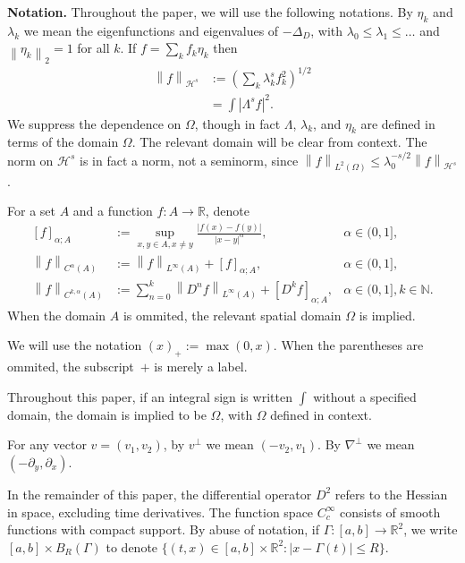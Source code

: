 \documentclass[11pt]{amsart}
\theoremstyle{remark}
\theoremstyle{definition}
\newcommand{\R}{\mathbb{R}}
\newcommand{\N}{\mathbb{N}}
\newcommand{\norm}[1]{\left\lVert#1\right\rVert}
\newcommand{\paren}[1]{\left( #1 \right)}
\newcommand{\bracket}[1]{\left[ #1 \right]}
\newcommand{\abs}[1]{\left\lvert #1 \right\rvert}
\newcommand{\del}{\partial}
\newcommand{\grad}{\nabla}
\newcommand{\Laplace}{\Delta}
\newcommand{\eigen}[1]{\eta_{#1}} %
\newcommand{\Ctest}{C_c^\infty}
\newcommand{\HD}{\mathcal{H}}
\newcommand{\HDint}[2]{\int \abs{\Lambda^{#1} #2}^2}
\begin{document}
\textbf{Notation.} Throughout the paper, we will use the following notations.
By $\eigen{k}$ and $\lambda_k$ we mean the eigenfunctions and eigenvalues of $-\Laplace_D$, with $\lambda_0 \leq \lambda_1 \leq \ldots$ and $\norm{\eigen{k}}_2 = 1$ for all $k$.  
If $f = \sum_k f_k \eigen{k}$ then
\begin{align*} 
\norm{f}_{\HD^s} &:= \paren{\sum_k \lambda_k^{s} f_k^2}^{1/2} 
\\ &= \HDint{s}{f}. 
\end{align*}
We suppress the dependence on $\Omega$, though in fact $\Lambda$, $\lambda_k$, and $\eigen{k}$ are defined in terms of the domain $\Omega$.  The relevant domain will be clear from context.  The norm on $\HD^s$ is in fact a norm, not a seminorm, since $\norm{f}_{L^2(\Omega)} \leq \lambda_0^{-s/2} \norm{f}_{\HD^s}$.  

For a set $A$ and a function $f:A \to \R$, denote
\begin{align*}
\bracket{f}_{\alpha;A} &:= \sup_{x,y \in A, x \neq y} \frac{|f(x)-f(y)|}{|x-y|^\alpha},  &\alpha \in (0,1], \\
\norm{f}_{C^\alpha(A)} &:= \norm{f}_{L^\infty(A)} + \bracket{f}_{\alpha;A}, & \alpha \in (0,1], \\
\norm{f}_{C^{k,\alpha}(A)} &:= \sum_{n=0}^k \norm{D^n f}_{L^\infty(A)} + \bracket{D^k f}_{\alpha;A}, & \alpha \in (0,1], k \in \N.
\end{align*}
When the domain $A$ is ommited, the relevant spatial domain $\Omega$ is implied.  

We will use the notation $(x)_+ := \max(0,x)$.  When the parentheses are ommited, the subscript~$+$ is merely a label.  

Throughout this paper, if an integral sign is written $\int$ without a specified domain, the domain is implied to be $\Omega$, with $\Omega$ defined in context.  

For any vector $v = (v_1,v_2)$, by $v^\perp$ we mean $(-v_2,v_1)$. By $\grad^\perp$ we mean $(-\del_y, \del_x)$.  

In the remainder of this paper, the differential operator $D^2$ refers to the Hessian in space, excluding time derivatives.  The function space $\Ctest$ consists of smooth functions with compact support.  By abuse of notation, if $\Gamma: [a,b] \to \R^2$, we write $[a,b] \times B_R(\Gamma)$ to denote $\{(t,x) \in [a,b]\times\R^2: |x-\Gamma(t)| \leq R\}$.  

\end{document}
